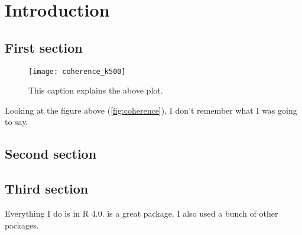 \chapter{Introduction}

\section{First section}

\lipsum[3-4]

\begin{figure}[h]
	\centering
	\texttt{[image: coherence\_k500]}
	\caption{\label{fig:coherence}This caption explains the above plot.}
\end{figure}

\lipsum[5]
Looking at the figure above (\autoref{fig:coherence}), I don't remember what I was going to say.


\section{Second section}

\lipsum[6-7]

\section{Third section}

Everything I do is in R 4.0\citep{R-4.0.0}. \citep{purrr} is a great package. I also used a
bunch of other packages\citep{qs,dplyr,ggplot2}.
